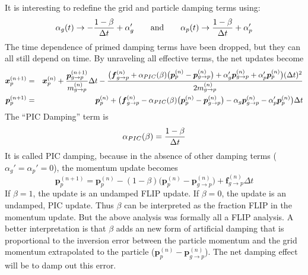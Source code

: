 \documentclass[11pt]{article}
\renewcommand{\vec}[1]{\boldsymbol{#1}}
\begin{document}
It is interesting to redefine the grid and particle damping terms using:
\begin{equation}
     \alpha_g(t) \to -{1-\beta\over\Delta t} + \alpha_g' \qquad{\rm and}\qquad \alpha_p(t) \to {1-\beta\over\Delta t} + \alpha_p'
     \label{pPICDamping}
\end{equation}
The time dependence of primed damping terms have been dropped, but they can all still depend on time. 
By unraveling all effective terms, the net updates become
\begin{eqnarray}
   \vec{x}_{p}^{(n+1)} & = & \vec{x}_p^{(n)} +{\vec p_{g\to p}^{(n+1)}\over m_{g\to p}^{(n)}}\Delta t
       - {\bigl(\vec{f}_{g\to p}^{(n)} + \alpha_{PIC}(\beta)\bigl(\vec p_p^{(n)}-\vec p_{g\to p}^{(n)}\bigr) +
        \alpha_g'\vec p_{g\to p}^{(n)}+  \alpha_p'\vec p_p^{(n)} \bigr)(\Delta t)^2\over 2m_{g\to p}^{(n)}}  \\
   \vec{p}_{p}^{(n+1)} & = & \vec{p}_p^{(n)} + \bigl(\vec{f}_{g\to p}^{(n)} - \alpha_{PIC}(\beta)\bigl(\vec p_p^{(n)}-\vec p_{g\to p}^{(n)}\bigr)
         -  \alpha_g\vec{p}_{g\to p}^{(n)} -  \alpha_p'\vec{p}_p^{(n)} \bigr)\Delta t 
\end{eqnarray}
The ``PIC Damping'' term is
\begin{equation}
       \alpha_{PIC}(\beta) = {1-\beta\over \Delta t}
\end{equation}
It is called PIC damping, because in the absence of other damping terms ($\alpha_g'=\alpha_p'=0$), the momentum update becomes
\begin{equation}
   \vec{p}_{p}^{(n+1)} = \vec{p}_p^{(n)}  - (1-\beta)\bigl(\vec p_p^{(n)}-\vec p_{g\to p}^{(n)}\bigr)
         + \vec{f}_{g\to p}^{(n)}\Delta t 
\end{equation}
If $\beta=1$, the update is an undamped FLIP update. If $\beta=0$, the update is an undamped, PIC update. Thus $\beta$ can be interpreted as the fraction FLIP in the momentum update. But the above analysis was formally all a FLIP analysis. A better interpretation is that $\beta$ adds an new form of artificial damping that is proportional to the inversion error between the particle momentum and the grid momentum extrapolated to the particle ($\vec p_p^{(n)}-\vec p_{g\to p}^{(n)}$). The net damping effect will be to damp out this error.
\end{document}
